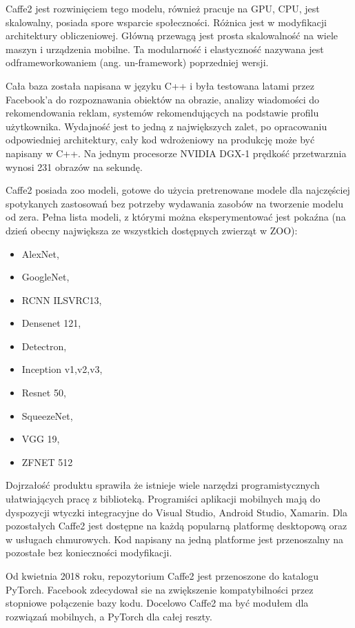 \documentclass[12pt,a4paper,twoside,titlepage,openright]{book}
\begin{document}
Caffe2 jest rozwinięciem tego modelu, również pracuje na GPU, CPU, jest skalowalny, posiada spore wsparcie społeczności. Różnica jest w modyfikacji architektury obliczeniowej. Główną przewagą jest prosta skalowalność na wiele maszyn i urządzenia mobilne. Ta modularność i elastyczność nazywana jest odframeworkowaniem (ang. un-framework) poprzedniej wersji.
\cite{DBLP:journals/corr/JiaSDKLGGD14}

Cała baza została napisana w języku C++ i była testowana latami przez Facebook'a do rozpoznawania obiektów na obrazie, analizy wiadomości do rekomendowania reklam, systemów rekomendujących na podstawie profilu użytkownika. Wydajność jest to jedną z największych zalet, po opracowaniu odpowiedniej architektury, cały kod wdrożeniowy na produkcję może być napisany w C++. Na jednym procesorze NVIDIA DGX-1 prędkość przetwarznia wynosi 231 obrazów na sekundę.\cite{NvidiaCaffe2(https://developer.nvidia.com/caffe2)}

Caffe2 posiada zoo modeli, gotowe do użycia pretrenowane modele dla najczęściej spotykanych zastosowań bez potrzeby wydawania zasobów na tworzenie modelu od zera. Pełna lista modeli, z którymi można eksperymentować jest pokaźna (na dzień obecny największa ze wszystkich dostępnych zwierząt w ZOO):
\begin{itemize}
\item AlexNet,
\item GoogleNet,
\item RCNN ILSVRC13,
\item Densenet 121,
\item Detectron,
\item Inception v1,v2,v3,
\item Resnet 50,
\item SqueezeNet,
\item VGG 19,
\item ZFNET 512
\end{itemize}

Dojrzałość produktu sprawiła że istnieje wiele narzędzi programistycznych ułatwiających pracę z biblioteką. Programiści aplikacji mobilnych mają do dyspozycji wtyczki integracyjne do Visual Studio, Android Studio, Xamarin. Dla pozostałych Caffe2 jest dostępne na każdą popularną platformę desktopową oraz w usługach chmurowych. Kod napisany na jedną platforme jest przenoszalny na pozostałe bez konieczności modyfikacji.

Od kwietnia 2018 roku, repozytorium Caffe2 jest przenoszone do katalogu PyTorch. Facebook zdecydował sie na zwiększenie kompatybilności przez stopniowe połączenie bazy kodu. Docelowo Caffe2 ma być modułem dla rozwiązań mobilnych, a PyTorch dla całej reszty.
\end{document}
